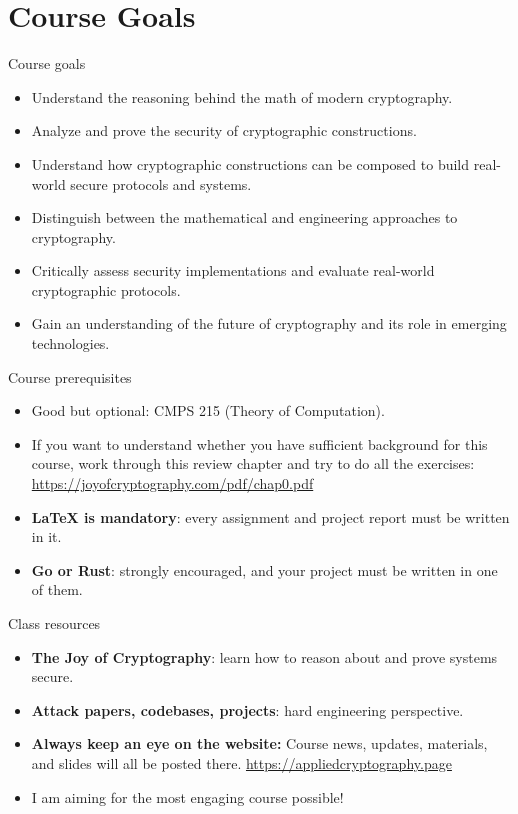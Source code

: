 \ifdefined\PRESENTATION\else\PassOptionsToClass{handout}{beamer}\fi\documentclass[aspectratio=169, lualatex]{beamer}
\begin{document}
\section{Course Goals}

\begin{frame}{Course goals}
	\begin{itemize}[<+->]
		\item Understand the reasoning behind the math of modern cryptography.
		\item Analyze and prove the security of cryptographic constructions.
		\item Understand how cryptographic constructions can be composed to build real-world
		      secure protocols and systems.
		\item Distinguish between the mathematical and engineering approaches to
		      cryptography.
		\item Critically assess security implementations and evaluate real-world cryptographic
		      protocols.
		\item Gain an understanding of the future of cryptography and its role in emerging
		      technologies.
	\end{itemize}
\end{frame}

\begin{frame}{Course prerequisites}
	\begin{itemize}
		\item Good but optional: CMPS 215 (Theory of Computation).
		\item If you want to understand whether you have sufficient background for this course, work through this review chapter and try to do all the exercises: \url{https://joyofcryptography.com/pdf/chap0.pdf}
		\item \textbf{\LaTeX{} is mandatory}: every assignment and project report must be written in it.
		\item \textbf{Go or Rust}: strongly encouraged, and your project must be written in one of them.
	\end{itemize}
\end{frame}

\begin{frame}{Class resources}
	\begin{itemize}[<+->]
		\item \textbf{The Joy of Cryptography}: learn how to reason about and prove systems secure.
		\item \textbf{Attack papers, codebases, projects}: hard engineering perspective.
		      \vspace{1cm}
		\item \textbf{Always keep an eye on the website:} Course news, updates,
		      materials, and slides will all be posted there.
		      \url{https://appliedcryptography.page}
		\item I am aiming for the most engaging course possible!
	\end{itemize}
\end{frame}
\end{document}
